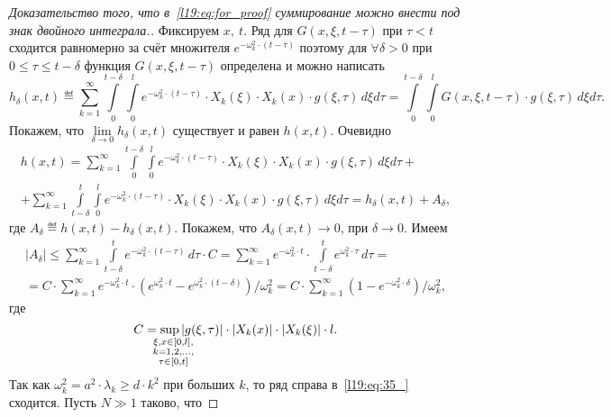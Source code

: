\begin{proof}[Доказательство того, что в~\eqref{l19:eq:for_proof} суммирование можно внести под знак двойного интеграла.] Фиксируем $x,\ t$. Ряд для $G(x,\xi,t-\tau)$ при $\tau<t$ сходится равномерно за счёт множителя $\displaystyle e^{-\omega_k^2\cdot(t-\tau)}$ поэтому для $\forall\delta>0$ при $0\leqslant\tau\leqslant t-\delta$ функция $G(x,\xi,t-\tau)$ определена и можно написать
	\begin{equation*}
		h_{\delta}(x,t)\eqdef\sum\limits_{k=1}^{\infty}\int\limits_0^{t-\delta}\int\limits_0^l e^{-\omega_k^2\cdot(t-\tau)}\cdot X_k(\xi)\cdot X_k(x)\cdot g(\xi,\tau)\,d\xi d\tau=\int\limits_0^{t-\delta}\int\limits_0^l G(x,\xi,t-\tau)\cdot g(\xi,\tau)\,d\xi d\tau.
	\end{equation*}
	Покажем, что $\displaystyle\lim\limits_{\delta\to0}h_{\delta}(x,t)$ существует и равен $h(x,t)$. Очевидно 
	\begin{multline}\label{l19:eq:34_}
		h(x,t)=	\sum\limits_{k=1}^{\infty}\int\limits_0^{t-\delta}\int\limits_0^l e^{-\omega_k^2\cdot(t-\tau)}\cdot X_k(\xi)\cdot X_k(x)\cdot g(\xi,\tau)\,d\xi d\tau+\\
		+\sum\limits_{k=1}^{\infty}\int\limits_{t-\delta}^t\int\limits_0^l e^{-\omega_k^2\cdot(t-\tau)}\cdot X_k(\xi)\cdot X_k(x)\cdot g(\xi,\tau)\,d\xi d\tau=h_{\delta}(x,t)+A_{\delta},
	\end{multline}
	где $A_{\delta}\eqdef h(x,t)-h_{\delta}(x,t)$. Покажем, что $A_{\delta}(x,t)\to0$, при $\delta\to0$. Имеем
	\begin{multline}
		\label{l19:eq:35_}
		|A_{\delta}|\leqslant\sum\limits_{k=1}^{\infty}\int\limits_{t-\delta}^t e^{-\omega_k^2\cdot(t-\tau)}\,d\tau\cdot C=\sum\limits_{k=1}^{\infty}e^{-\omega_k^2\cdot t}\cdot\int\limits_{t-\delta}^t e^{\omega_k^2\cdot\tau}\,d\tau=\\
		=C\cdot\sum\limits_{k=1}^{\infty}e^{-\omega_k^2\cdot t}\cdot\left(e^{\omega_k^2\cdot t}-e^{\omega_k^2\cdot(t-\delta)}\right)\Big/\omega_k^2=C\cdot\sum\limits_{k=1}^{\infty}\left(1-e^{-\omega_k^2\cdot\delta}\right)\Big/\omega_k^2,
	\end{multline}	
	где 
	\begin{equation*}
		C=\sup\limits_{\lefteqn{\scriptstyle\substack{\xi,x\in[0,l],\\ k=1,2,\ldots,\\ \tau\in[0,t]}}}|g(\xi,\tau)|\cdot|X_k(x)|\cdot|X_k(\xi)|\cdot l.
	\end{equation*}
	Так как $\omega_k^2=a^2\cdot\lambda_k\geqslant d\cdot k^2$ при больших $k$, то ряд справа в~\eqref{l19:eq:35_} сходится. Пусть $N\gg1$ таково, что 

\end{proof}
